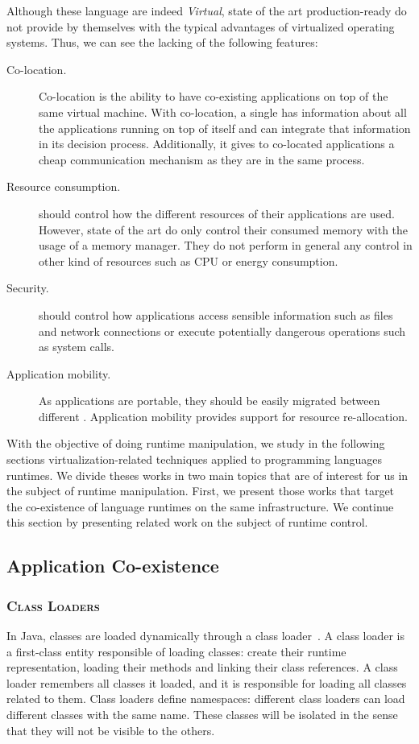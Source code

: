 Although these language \VMs are indeed \emph{Virtual}, state of the art production-ready \VMs do not provide by themselves with the typical advantages of virtualized operating systems. Thus, we can see the lacking of the following features:

\begin{description}
\item[Co-location.] Co-location is the ability to have co-existing applications on top of the same virtual machine. With co-location, a single \VM has information about all the applications running on top of itself and can integrate that information in its decision process. Additionally, it gives to co-located applications a cheap communication mechanism as they are in the same process.
\item[Resource consumption.] \VMs should control how the different resources of their applications are used. However, state of the art \VMs do only control their consumed memory with the usage of a memory manager. They do not perform in general any control in other kind of resources such as CPU or energy consumption.
\item[Security.] \VMs should control how applications access sensible information such as files and network connections or execute potentially dangerous operations such as system calls.
\item[Application mobility.] As applications are portable, they should be easily migrated between different \VMs. Application mobility provides support for resource re-allocation.
\end{description}

With the objective of doing runtime manipulation, we study in the following sections virtualization-related techniques applied to programming languages runtimes. We divide theses works in two main topics that are of interest for us in the subject of runtime manipulation. First, we present those works that target the co-existence of language runtimes on the same infrastructure. We continue this section by presenting related work on the subject of runtime control.

\subsection{Application Co-existence}

\subsubsection*{\textsc{Class Loaders}}
In Java, classes are loaded dynamically through a class loader~\cite{Lian98a}. A class loader is a first-class entity responsible of loading classes: create their runtime representation, loading their methods and linking their class references. A class loader remembers all classes it loaded, and it is responsible for loading all classes related to  them. Class loaders define namespaces: different class loaders can load different classes with the same name. These classes will be isolated in the sense that they will not be visible to the others.

